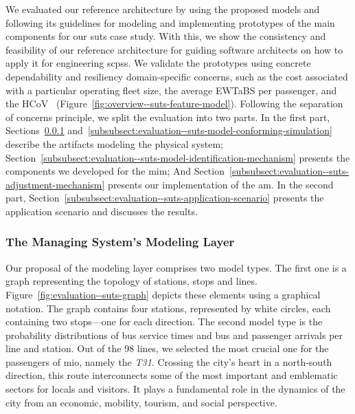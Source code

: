 We evaluated our reference architecture by using the proposed models and following its guidelines for modeling and implementing prototypes of the main components for our \gls{suts} case study. With this, we show the consistency and feasibility of our reference architecture for guiding software architects on how to apply it for engineering \glspl{scps}. We validate the prototypes using concrete dependability and resiliency domain-specific concerns, such as the cost associated with a particular operating fleet size, the average \gls{EWTaBS} per passenger, and the \gls{HCoV}~\cite{hounsell-1998-automatic,strathman-1999-automated,chandrasekar-2002-simulation} (\cf Figure~\ref{fig:overview--suts-feature-model}). Following the separation of concerns principle, we split the evaluation into two parts. In the first part, Sections~\ref{subsubsect:evaluation--suts-modeling-layer} and~\ref{subsubsect:evaluation--suts-model-conforming-simulation} describe the artifacts modeling the physical system; Section~\ref{subsubsect:evaluation--suts-model-identification-mechanism} presents the components we developed for the \gls{mim}; And Section~\ref{subsubsect:evaluation--suts-adjustment-mechanism} presents our implementation of the \gls{am}. In the second part, Section~\ref{subsubsect:evaluation--suts-application-scenario} presents the application scenario and discusses the results.


\subsubsection{The Managing System's Modeling Layer}
\label{subsubsect:evaluation--suts-modeling-layer}

Our proposal of the modeling layer comprises two model types. The first one is a graph representing the topology of stations, stops and lines. Figure~\ref{fig:evaluation--suts-graph} depicts these elements using a graphical notation. The graph contains four stations, represented by white circles, each containing two stops---one for each direction. The second model type is the probability distributions of bus service times and bus and passenger arrivals per line and station. Out of the 98 lines, we selected the most crucial one for the passengers of \gls{mio}, namely the \textit{T31}. Crossing the city's heart in a north-south direction, this route interconnects some of the most important and emblematic sectors for locals and visitors. It plays a fundamental role in the dynamics of the city from an economic, mobility, tourism, and social perspective.

